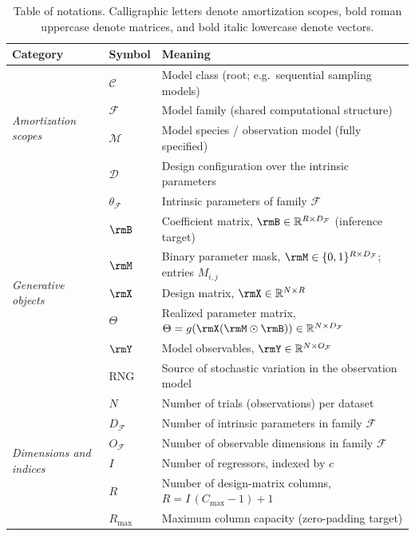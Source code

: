 \begin{table}[h]
\centering
\caption{Table of notations. Calligraphic letters denote amortization scopes,
bold roman uppercase denote matrices, and bold italic lowercase denote vectors.}
\renewcommand{\arraystretch}{1.1}
\begin{tabularx}{\linewidth}{@{}p{2.4cm} l >{\raggedright\arraybackslash}X@{}}
\toprule
\textbf{Category} & \textbf{Symbol} &\textbf{Meaning} \\
\midrule
\multirow{4}{=}{\textit{Amortization scopes}}
 & $\mathcal{C}$ & Model class (root; e.g.\ sequential sampling models) \\
 & $\mathcal{F}$ & Model family (shared computational structure) \\
 & $\mathcal{M}$ & Model species / observation model (fully specified) \\
 & $\mathcal{D}$ & Design configuration over the intrinsic parameters \\
\midrule
\multirow{7}{=}{\textit{Generative objects}}
 & $\theta_{\mathcal{F}}$ & Intrinsic parameters of family $\mathcal{F}$ \\
 & $\rmB$ & Coefficient matrix, $\rmB \in \mathbb{R}^{R \times D_{\mathcal{F}}}$ (inference target) \\
 & $\rmM$ & Binary parameter mask, $\rmM \in \{0,1\}^{R \times D_{\mathcal{F}}}$; entries $M_{i,j}$ \\
 & $\rmX$ & Design matrix, $\rmX \in \mathbb{R}^{N \times R}$ \\
 & $\Theta$ & Realized parameter matrix, $\Theta = g(\rmX(\rmM \odot \rmB)) \in \mathbb{R}^{N \times D_{\mathcal{F}}}$ \\
 & $\rmY$ & Model observables, $\rmY \in \mathbb{R}^{N \times O_{\mathcal{F}}}$ \\
 & $\mathrm{RNG}$ & Source of stochastic variation in the observation model \\
\midrule
\multirow{11}{=}{\textit{Dimensions and indices}}
 & $N$ & Number of trials (observations) per dataset \\
 & $D_{\mathcal{F}}$ & Number of intrinsic parameters in family $\mathcal{F}$ \\
 & $O_{\mathcal{F}}$ & Number of observable dimensions in family $\mathcal{F}$ \\
 & $I$ & Number of regressors, indexed by $c$ \\
 & $R$ & Number of design-matrix columns, $R = I\,(C_{\mathrm{max}}-1)+1$ \\
 & $R_{\mathrm{max}}$ & Maximum column capacity (zero-padding target) \\

\end{tabularx}
\end{table}
